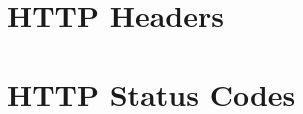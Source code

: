 \documentclass [8pt] {extarticle}
\begin{document}
    \section {HTTP Headers}
    \section {HTTP Status Codes}
\end{document}

